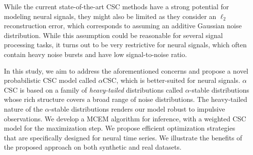 




While the current state-of-the-art \ac{CSC} methods have a strong potential for modeling neural signals, they might also be limited as they consider an $\ell_2$ reconstruction error, which corresponds to assuming an additive Gaussian noise distribution. While this assumption could be reasonable for several signal processing tasks, it turns out to be very restrictive for neural signals, which often contain heavy noise bursts and have low signal-to-noise ratio.

%

In this study, we aim to address the aforementioned concerns and propose a novel probabilistic \ac{CSC} model called $\alpha$CSC, which is better-suited for neural signals. $\alpha$CSC is based on a family of \emph{heavy-tailed} distributions called $\alpha$-stable distributions \citep{samorodnitsky1994stable} whose rich structure covers a broad range of noise distributions. The heavy-tailed nature of the $\alpha$-stable distributions renders our model robust to impulsive observations. We develop a \ac{MCEM} algorithm for inference, with a weighted \ac{CSC} model for the maximization step. We propose efficient optimization strategies that are specifically designed for neural time series.
%
We illustrate the benefits of the proposed approach on both synthetic and real datasets.

